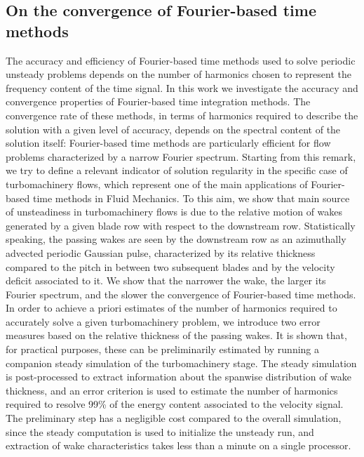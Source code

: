 \subsection*{On the convergence of Fourier-based time methods}

The accuracy and efficiency of Fourier-based time methods 
used to solve periodic unsteady problems depends on the number of harmonics
chosen to represent the frequency content of the time signal.
In this work we investigate the accuracy and convergence properties 
of Fourier-based time integration methods. The convergence rate 
of these methods, in terms of harmonics required to describe the solution 
with a given level of accuracy, depends on the spectral content of the 
solution itself: Fourier-based time methods are particularly efficient 
for flow problems characterized by a narrow Fourier 
spectrum. Starting from this remark, we try to define a relevant 
indicator of solution regularity in the specific case of turbomachinery 
flows, which represent one of the main applications of Fourier-based 
time methods in Fluid Mechanics.
To this aim, we show that main source of unsteadiness in 
turbomachinery flows is due to the relative motion of wakes 
generated by a given blade row with respect to the downstream row. 
Statistically speaking, the passing wakes are seen by the downstream 
row as an azimuthally advected periodic Gaussian pulse, 
characterized by its relative thickness compared to the pitch 
in between two subsequent blades and by the velocity deficit 
associated to it. We show that the narrower the wake, the larger 
its Fourier spectrum, and the slower the convergence of Fourier-based time methods.
In order to achieve a priori estimates of the number of 
harmonics required to accurately solve a given turbomachinery 
problem, we introduce two error measures based on the relative 
thickness of the passing wakes. It is shown that, for practical 
purposes, these can be preliminarily estimated by running a 
companion steady simulation of the turbomachinery stage. The 
steady simulation is post-processed to extract information about 
the spanwise distribution of wake thickness, and an error criterion 
is used to estimate the number of harmonics required to resolve 99\% 
of the energy content associated to the velocity signal. The 
preliminary step has a negligible cost compared to the overall 
simulation, since the steady computation is used to initialize 
the unsteady run, and extraction of wake characteristics takes 
less than a minute on a single processor. 

